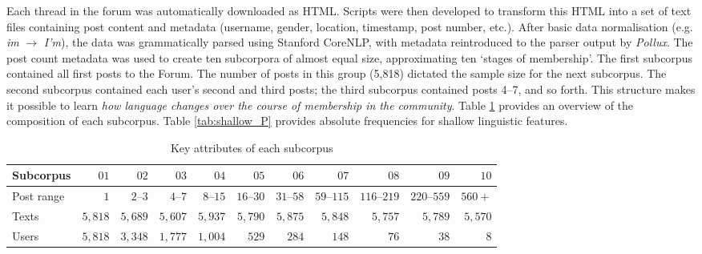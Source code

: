 \documentclass{article}
\begin{document}
Each thread in the forum was automatically downloaded as HTML. Scripts were then developed to transform this HTML into a set of text files containing post content and metadata (username, gender, location, timestamp, post number, etc.). After basic data normalisation (e.g. \emph{im} $\rightarrow$ \emph{I'm}), the data was grammatically parsed using Stanford CoreNLP, with metadata reintroduced to the parser output by \emph{Pollux}. The post count metadata was used to create ten subcorpora of almost equal size, approximating ten `stages of membership'. The first subcorpus contained all first posts to the Forum. The number of posts in this group (5,818) dictated the sample size for the next subcorpus. The second subcorpus contained each user's second and third posts; the third subcorpus contained posts 4--7, and so forth. This structure makes it possible to learn \emph{how language changes over the course of membership in the community}. Table \ref{tab:p_stats} provides an overview of the composition of each subcorpus. Table \ref{tab:shallow_P} provides absolute frequencies for shallow linguistic features.

\begin{table}[htb]
\centering
\footnotesize
\begin{tabularx}{1\textwidth}{Xrrrrrrrrrr}
\toprule
Subcorpus & $01$ & $02$ & $03$ & $04$ & $05$ & $06$ & $07$ & $08$ & $09$ & $10$ \\ \midrule
Post range & $1    $      &  $ 2\mbox{--}3  $   & $4\mbox{--}7 $    & $8\mbox{--}15$    & $16\mbox{--}30$ & $31\mbox{--}58$   &  $59\mbox{--}115$  & $116\mbox{--}219$ & $220\mbox{--}559$  & $560+$  \\
Texts      & $5,818$      &  $ 5,689 $   & $5,607$    & $5,937 $    & $5,790 $ & $5,875 $   &  $5,848  $  & $5,757   $ & $5,789$    & $5,570$ \\
Users     &  $5,818$      &  $ 3,348 $   & $1,777$    & $1,004$    & $ 529  $ & $284   $   &  $148    $  & $76      $ & $38$       &   $8$ \\ \bottomrule
\end{tabularx}
\caption{Key attributes of each subcorpus}
\label{tab:p_stats}
\end{table}
\end{document}
